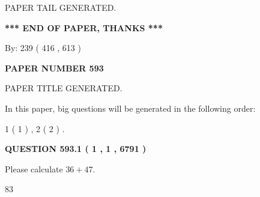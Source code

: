 \documentclass[12pt]{article}
\begin{document}
   
   
\vspace{2.0in} PAPER TAIL GENERATED.
   
   
   
   
\vspace{1.0in} 
{\textbf{\large{ *** END OF PAPER, THANKS *** }}} 
   
   
\hspace{1.0in} By: 
 239 ( 416 ,  613 )
   
   
   
   
\newpage 
\setcounter{page}{ 
   593001 } 
   
   
   
   
 {\textbf{ \Large{ PAPER NUMBER  593  }}}
   
   
\vspace{0.2in}
   
   
   
   
   
   
   
   
 \vspace{0.2in}
 
 
 
 
   
   
 PAPER TITLE GENERATED.
   
   
   
\vspace{0.2in}
   
In this paper, big questions will be generated in the following order: 
   
   
   1 ( 1 )
 ,
   2 ( 2 )
 .
  
\vspace{0.2in}
  
{\textbf{\Large{QUESTION
593.1 
 ( 1 , 1 , 6791 )
}}}
  
  
 
Please calculate $ %
36 +  %
47 $.
 
 
 
\noindent{}
 
 

83
 
 
\noindent{}
 
 

 
 
 
\noindent{}
 
\end{document}
